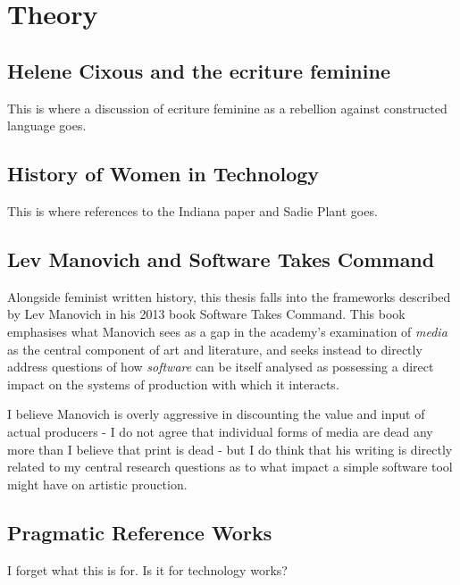 
\section{Theory}

\subsection{Helene Cixous and the ecriture feminine}
This is where a discussion of ecriture feminine as a rebellion against constructed language goes.

\subsection{History of Women in Technology}
This is where references to the Indiana paper and Sadie Plant goes.

\subsection{Lev Manovich and Software Takes Command}
Alongside feminist written history, this thesis falls into the frameworks described by Lev Manovich in his 2013 book Software Takes Command. This book emphasises what Manovich sees as a gap in the academy's examination of \textit{media} as the central component of art and literature, and seeks instead to directly address questions of how \textit{software} can be itself analysed as possessing a direct impact on the systems of production with which it interacts.

I believe Manovich is overly aggressive in discounting the value and input of actual producers - I do not agree that individual forms of media are dead any more than I believe that print is dead - but I do think that his writing is directly related to my central research questions as to what impact a simple software tool might have on artistic prouction.

\subsection{Pragmatic Reference Works}
I forget what this is for. Is it for technology works?

